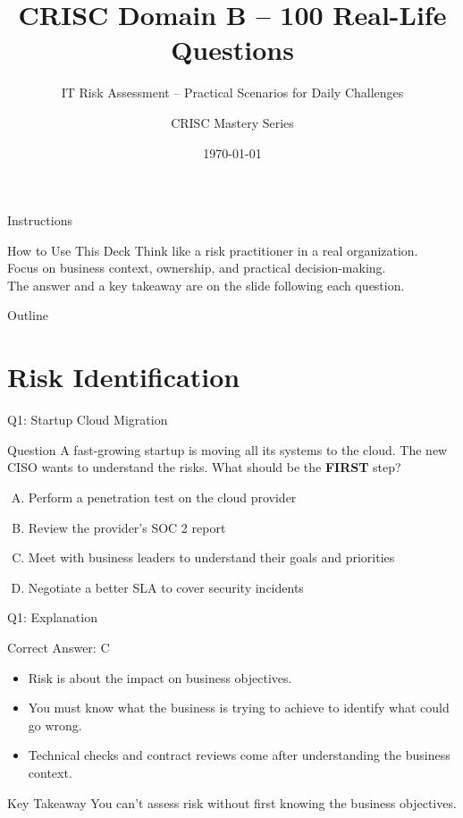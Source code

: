 \documentclass[aspectratio=169]{beamer}
\title{CRISC Domain B -- 100 Real-Life Questions}
\subtitle{IT Risk Assessment -- Practical Scenarios for Daily Challenges}
\author{CRISC Mastery Series}
\date{\today}
\newcommand{\hq}[7]{%
	\begin{frame}{Q#1: #2}
		\begin{block}{Question}
			#3
		\end{block}
		\begin{enumerate}[(A)]
			#4
		\end{enumerate}
	\end{frame}
	\begin{frame}{Q#1: Explanation}
		\begin{block}{Correct Answer: #5}
			\begin{itemize}
				#6
			\end{itemize}
		\end{block}
		\begin{alertblock}{Key Takeaway}
			#7
		\end{alertblock}
	\end{frame}
}
\begin{document}
	
	\begin{frame}
		\titlepage
	\end{frame}
	
	\begin{frame}{Instructions}
		\begin{alertblock}{How to Use This Deck}
			Think like a risk practitioner in a real organization.\\
			Focus on business context, ownership, and practical decision-making.\\
			The answer and a key takeaway are on the slide following each question.
		\end{alertblock}
	\end{frame}
	
	\begin{frame}{Outline}
		\tableofcontents
	\end{frame}
	
	\section{Risk Identification}
	
	\hq{1}{Startup Cloud Migration}
	{A fast-growing startup is moving all its systems to the cloud. The new CISO wants to understand the risks. What should be the \textbf{FIRST} step?}
	{\item Perform a penetration test on the cloud provider
		\item Review the provider's SOC 2 report
		\item Meet with business leaders to understand their goals and priorities
		\item Negotiate a better SLA to cover security incidents}
	{C}
	{\item Risk is about the impact on business objectives.
		\item You must know what the business is trying to achieve to identify what could go wrong.
		\item Technical checks and contract reviews come after understanding the business context.}
	{You can't assess risk without first knowing the business objectives.}
	
\end{document}
